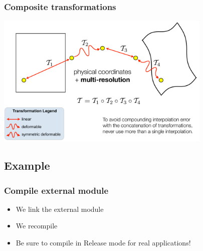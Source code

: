 
\begin{frame}
\frametitle{Composite transformations}
\includegraphics[height=2.5in]{../Art/composite}
\end{frame}

\subsection{Example}

\begin{frame}
\frametitle{Compile external module}
\begin{itemize}
\item We link the external module
\item We recompile
\item Be sure to compile in Release mode for real applications!
\end{itemize}
\end{frame}


